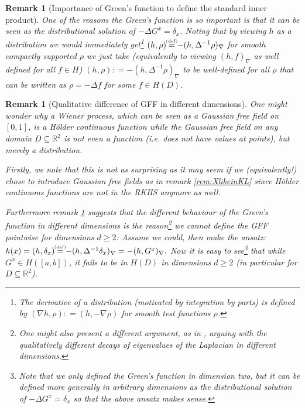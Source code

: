 \documentclass[11pt,reqno]{amsart}
\numberwithin{equation}{section}
\newtheorem{rem}[thm]{Remark}
\newcommand{\eqbydef}{\mathrel{\stackrel{\hspace*{-3mm}\text{\tiny(def)}\hspace*{-3mm}}{=}}}
\newcommand{\deq}{\mathrel{\mathop:}=}
\begin{document}
\begin{rem}[Importance of Green's function to define the standard inner product]\label{rem:usesofGreensfct}
	One of the reasons the Green's function is so important is that it can be seen as the distributional solution of $-\Delta G^x = \delta_x$. 
	Noting that by viewing $h$ as a distribution we would immediately get\footnote{The derivative of a distribution (motivated by integration by parts) is defined by $(\nabla h,\rho)\deq(h,-\nabla\rho)$ for smooth test functions $\rho$.} $(h,\rho)\eqbydef -(h,\Delta^{-1}\rho)_\nabla$ for smooth compactly supported $\rho$  we just take (equivalently to viewing $(h,f)_\nabla$ as well defined for all $f\in H$) $(h,\rho)\deq -(h,\Delta^{-1}\rho)_\nabla$ to be well-defined for all $\rho$ that can be written as $\rho = -\Delta f$ for some $f\in H(D)$.
\end{rem}

\begin{rem}[Qualitative difference of GFF in different dimensions]
	One might wonder why a Wiener process, which can be seen as a Gaussian free field on $[0,1]$, is a H\"older continuous function while the Gaussian free field on any domain $D\subseteq \mathbb R^2$ is not even a function (i.e. does not have values at points), but merely a distribution.
	
	Firstly, we note that this is not as surprising as it may seem if we (equivalently!) chose to introduce Gaussian free fields as in remark \ref{rem:XlikeinKL} since H\"older continuous functions are not in the RKHS anymore as well.
	
	Furthermore remark \ref{rem:usesofGreensfct} suggests that the different behaviour of the Green's function in different dimensions is the reason\footnote{One might also present a different argument, as in \cite{She07}, arguing with the qualitatively different decays of eigenvalues of the Laplacian in different dimensions.} we cannot define the GFF pointwise for dimensions $d\geq 2$: Assume we could, then make the ansatz: $h(x)=(h,\delta_x)\eqbydef -(h,\Delta^{-1}\delta_x)_\nabla = -(h,G^x)_\nabla.$ Now it is easy to see\footnote{Note that we only defined the Green's function in dimension two, but it can be defined more generally in arbitrary dimensions as the distributional solution of $-\Delta G^x=\delta_x$ so that the above ansatz makes sense.} that while $G^x\in H([a,b])$, it fails to be in $H(D)$ in dimensions $d\geq 2$ (in particular for $D\subseteq\mathbb R^2$).
\end{rem}
\end{document}
